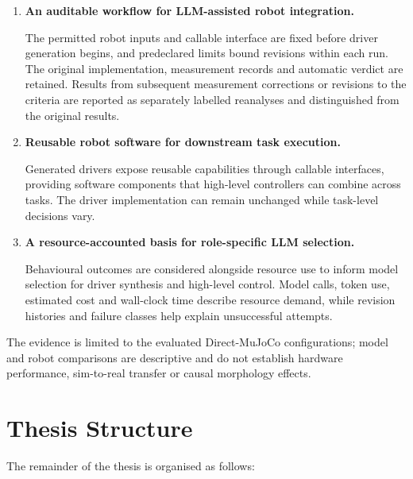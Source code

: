 \begin{enumerate}[leftmargin=*,itemsep=0.8em]

  \item \textbf{An auditable workflow for LLM-assisted robot integration.}

  The permitted robot inputs and callable interface are fixed before driver
  generation begins, and predeclared limits bound revisions within each run.
  The original implementation, measurement records and automatic verdict are
  retained. Results from subsequent measurement corrections or revisions to
  the criteria are reported as separately labelled reanalyses and distinguished
  from the original results.

  \item \textbf{Reusable robot software for downstream task execution.}

  Generated drivers expose reusable capabilities through callable interfaces,
  providing software components that high-level controllers can combine
  across tasks. The driver implementation can remain unchanged while
  task-level decisions vary.

  \item \textbf{A resource-accounted basis for role-specific LLM selection.}

  Behavioural outcomes are considered alongside resource use to inform model
  selection for driver synthesis and high-level control. Model calls, token
  use, estimated cost and wall-clock time describe resource demand, while
  revision histories and failure classes help explain unsuccessful attempts.

\end{enumerate}

The evidence is limited to the evaluated Direct-MuJoCo configurations; model
and robot comparisons are descriptive and do not establish hardware
performance, sim-to-real transfer or causal morphology effects.

\section[Thesis Structure]{Thesis Structure}
\label{sec:intro-structure}

The remainder of the thesis is organised as follows:

